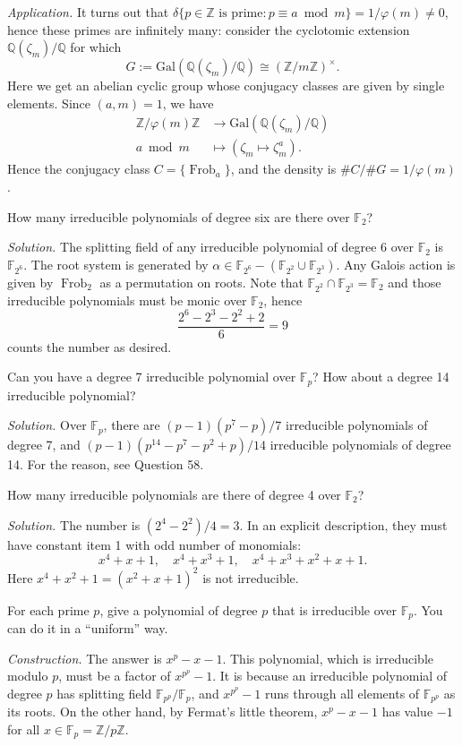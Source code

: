 \documentclass{mathproblems}
\newcommand\F{\mathbb{F}}
\newcommand\Q{\mathbb{Q}}
\newcommand\Z{\mathbb{Z}}
\newcommand\Gal{\mathrm{Gal}}
\begin{document}
\begin{questions}
\textit{Application.} It turns out that $\delta\{p\in \Z \text{ is prime}: p\equiv a\bmod m\}=1/\varphi(m)\neq 0$, hence these primes are infinitely many: consider the cyclotomic extension $\Q(\zeta_m)/\Q$ for which
$$
G:=\Gal(\Q(\zeta_m)/\Q)\cong (\Z/m\Z)^\times.
$$
Here we get an abelian cyclic group whose conjugacy classes are given by single elements. Since $(a,m)=1$, we have
$$
\begin{aligned}
\Z/\varphi(m)\Z & \longrightarrow \Gal(\Q(\zeta_m)/\Q)\\
a\bmod m & \longmapsto (\zeta_m\mapsto \zeta_m^a).
\end{aligned}
$$
Hence the conjugacy class $C=\{\operatorname{Frob}_a\}$, and the density is $\#C/\#G=1/\varphi(m)$.


\miquestion
{\color{blue} How many irreducible polynomials of degree six are there over $\F_{2}$?}

\textit{Solution.}
The splitting field of any irreducible polynomial of degree 6 over $\F_2$ is $\F_{2^6}$. The root system is generated by $\alpha\in \F_{2^6} - (\F_{2^2}\cup \F_{2^3})$. Any Galois action is given by $\operatorname{Frob}_2$ as a permutation on roots. Note that $\F_{2^2}\cap \F_{2^3}=\F_2$ and those irreducible polynomials must be monic over $\F_2$, hence
$$
\frac{2^6-2^3-2^2+2}{6}=9
$$
counts the number as desired.

\miquestion
{\color{blue} Can you have a degree 7 irreducible polynomial over $\F_{p}$? How about a degree 14 irreducible polynomial?}

\textit{Solution.}
Over $\F_{p}$, there are $(p-1)(p^7-p)/7$ irreducible polynomials of degree 7, and $(p-1)(p^{14}-p^7-p^2+p)/14$ irreducible polynomials of degree 14. For the reason, see Question 58.

\miquestion
{\color{blue} How many irreducible polynomials are there of degree 4 over $\F_{2}$?}

\textit{Solution.}
The number is $(2^4-2^2)/4=3$. In an explicit description, they must have constant item 1 with odd number of monomials:
$$
x^4+x+1, \quad x^4+x^3+1, \quad x^4+x^3+x^2+x+1.
$$
Here $x^4+x^2+1=(x^2+x+1)^2$ is not irreducible.

\miquestion
{\color{blue} For each prime $p$, give a polynomial of degree $p$ that is irreducible over $\F_{p}$. You can do it in a ``uniform'' way.}

\textit{Construction.} The answer is $x^p-x-1$. This polynomial, which is irreducible modulo $p$, must be a factor of $x^{p^p}-1$. It is because an irreducible polynomial of degree $p$ has splitting field $\F_{p^p}/\F_p$, and $x^{p^p}-1$ runs through all elements of $\F_{p^p}$ as its roots. On the other hand, by Fermat's little theorem, $x^p-x-1$ has value $-1$ for all $x\in \F_p=\Z/p\Z$.



\end{questions}
\end{document}
